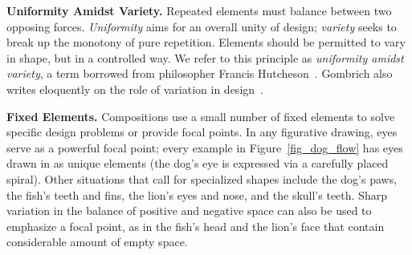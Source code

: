 \begin{items}
\item \textbf{Uniformity Amidst Variety.} Repeated elements must balance
  between two opposing forces.  \textit{Uniformity} 
  aims for an overall unity of design; \textit{variety}
  seeks to break up the monotony of
  pure repetition.  Elements should be permitted to vary in shape,
  but in a controlled way.  We refer to this principle
  as \textit{uniformity amidst variety}, a term borrowed from 
  philosopher Francis Hutcheson~\cite{Hutcheson1729}.
  Gombrich also writes eloquently on the role of variation in 
  design~\cite{Gombrich}.

\item \textbf{Fixed Elements.} Compositions use a small number of fixed
  elements to solve specific design problems or provide focal points.
  In any figurative drawing, eyes serve as a powerful focal point;
  every example in Figure~\ref{fig_dog_flow} has eyes drawn
  in as unique elements
  (the dog's eye is expressed via a carefully placed spiral).  Other
  situations that call for specialized shapes include the dog's paws,
  the fish's teeth and fins, 
  the lion's eyes and nose, %
  and the skull's teeth.
  Sharp variation in the balance of positive and negative space
  can also be used to emphasize a focal point,
  as in the fish's head and the lion's face that contain considerable amount of empty space.


\end{items}
